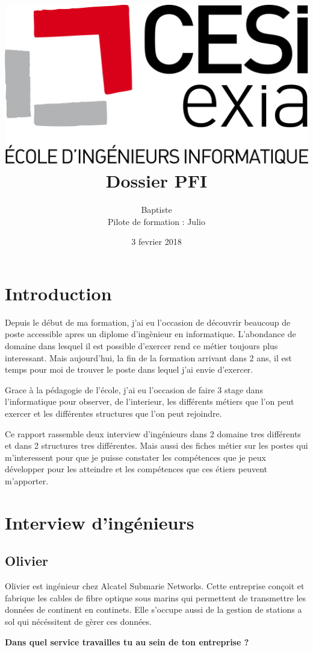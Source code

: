 \documentclass{article}
\title{\includegraphics[scale=0.1]{exia.png}\vspace{2cm}\\Dossier PFI}
\date{3 fevrier 2018}
\author{Baptiste \bsc{Saclier}\\Pilote de formation : Julio \bsc{Santilario}}
\newcommand{\question}[1]{\medskip\noindent\textbf{#1}\medskip}
\begin{document}
    \maketitle

    \clearpage

    \tableofcontents

    \section{Introduction}

    Depuis le début de ma formation, j'ai eu l'occasion de découvrir beaucoup de poste accessible apres un diplome d'ingènieur en informatique.
    L'abondance de domaine dans lesquel il est possible d'exercer rend ce métier toujours plus interessant.
    Mais aujourd'hui, la fin de la formation arrivant dans 2 ans, il est temps pour moi de trouver le poste dans lequel j'ai envie d'exercer.

    Grace à la pédagogie de l'école, j'ai eu l'occasion de faire 3 stage dans l'informatique pour observer, de l'interieur, les différents métiers que l'on peut exercer et les différentes structures que l'on peut rejoindre.

    Ce rapport rassemble deux interview d'ingénieurs dans 2 domaine tres différents et dans 2 structures tres différentes.
    Mais aussi des fiches métier sur les postes qui m'interessent pour que je puisse constater les compétences que je peux développer pour les atteindre et les compétences que ces étiers peuvent m'apporter.

    \clearpage

    \section{Interview d'ingénieurs}


    \subsection{Olivier }

    Olivier est ingénieur chez Alcatel Submarie Networks.
    Cette entreprise conçoit et fabrique les cables de fibre optique sous marins qui permettent de transmettre les données de continent en continets.
    Elle s'occupe aussi de la gestion de stations a sol qui nécéssitent de gèrer ces données.

    \question{Dans quel service travailles tu au sein de ton entreprise ?}
\end{document}
